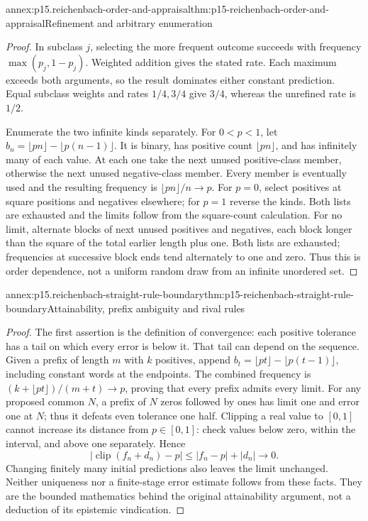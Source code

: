 \begin{annexitem}{annex:p15.reichenbach-order-and-appraisal}{thm:p15-reichenbach-order-and-appraisal}{Refinement and arbitrary enumeration}
\begin{proof}
In subclass \(j\), selecting the more frequent outcome succeeds
with frequency \(\max(p_j,1-p_j)\). Weighted addition gives
the stated rate. Each maximum exceeds both arguments, so the result
dominates either constant prediction. Equal subclass weights and
rates \(1/4,3/4\) give \(3/4\), whereas the unrefined rate
is \(1/2\).

Enumerate the two infinite kinds separately. For \(0<p<1\),
let \(b_n=\lfloor pn\rfloor-\lfloor p(n-1)\rfloor\).
It is binary, has positive count \(\lfloor pn\rfloor\), and
has infinitely many of each value. At each one take the next unused
positive-class member, otherwise the next unused negative-class member.
Every member is eventually used and the resulting frequency is
\(\lfloor pn\rfloor/n\to p\). For \(p=0\), select
positives at square positions and negatives elsewhere; for \(p=1\)
reverse the kinds. Both lists are exhausted and the limits follow
from the square-count calculation. For no limit, alternate blocks
of next unused positives and negatives, each block longer than the
square of the total earlier length plus one. Both lists are exhausted;
frequencies at successive block ends tend alternately to one and zero.
Thus this is order dependence, not a uniform random draw from an
infinite unordered set.
\end{proof}
\end{annexitem}

\begin{annexitem}{annex:p15.reichenbach-straight-rule-boundary}{thm:p15-reichenbach-straight-rule-boundary}{Attainability, prefix ambiguity and rival rules}
\begin{proof}
The first assertion is the definition of convergence: each positive
tolerance has a tail on which every error is below it. That tail
can depend on the sequence. Given a prefix of length \(m\) with
\(k\) positives, append
\(b_t=\lfloor pt\rfloor-\lfloor p(t-1)\rfloor\), including
constant words at the endpoints. The combined frequency is
\((k+\lfloor pt\rfloor)/(m+t)\to p\), proving that every
prefix admits every limit. For any proposed common \(N\), a
prefix of \(N\) zeros followed by ones has limit one and error
one at \(N\); thus it defeats even tolerance one half.
Clipping a real value to \([0,1]\) cannot increase its distance
from \(p\in[0,1]\): check values below zero, within the interval,
and above one separately. Hence
\[
 |\operatorname{clip}(f_n+d_n)-p|
 \leq|f_n-p|+|d_n|\to0.
\]
Changing finitely many initial predictions also leaves the limit
unchanged. Neither uniqueness nor a finite-stage error estimate follows
from these facts. They are the bounded mathematics behind the original
attainability argument, not a deduction of its epistemic vindication.
\end{proof}
\end{annexitem}

